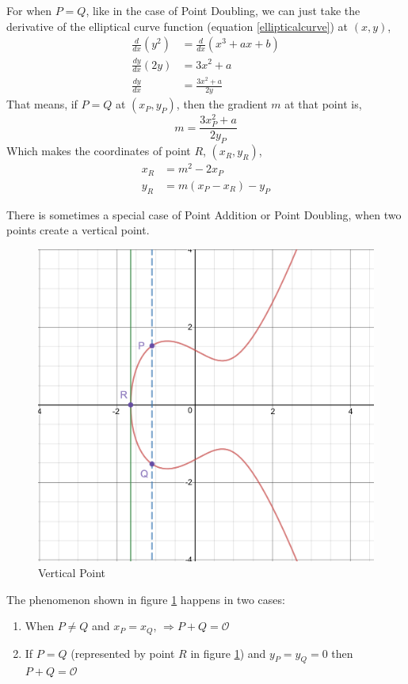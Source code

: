 \documentclass[a4paper,12pt]{article}
\theoremstyle{definition}
\begin{document}
For when $P=Q$, like in the case of Point Doubling, we can just take the derivative of the elliptical curve function (equation \ref{ellipticalcurve}) at $(x,y)$,
\begin{equation}
	\begin{split}
		\frac{d}{dx}(y^2) &= \frac{d}{dx}(x^3 +ax+b) \\
		\frac{dy}{dx}(2y) &= 3x^2+a \\
		\frac{dy}{dx} &= \frac{3x^2+a }{2y}
	\end{split}
\end{equation}
\indent That means, if $P=Q$ at $(x_P,y_P)$, then the gradient $m$ at that point is,
\begin{equation} \label{pointdoublingformula}
	m = \frac{3x_P^2+a }{2y_P} 
\end{equation}
\indent Which makes the coordinates of point $R$, $(x_R,y_R)$,
\begin{equation} \label{pointdoublingcoordinates}
	\begin{split}
		x_R &= m^2 -2x_P \\
		y_R &= m(x_P - x_R)-y_P
	\end{split}
\end{equation}

There is sometimes a special case of Point Addition or Point Doubling, when two points create a vertical point. 

\begin{figure}[!htb]
	 \centering
     \includegraphics[width=.6\linewidth]{verticalpoint2}
     \caption{Vertical Point}
     \label{verticalpointfigure}	
\end{figure}

The phenomenon shown in figure \ref{verticalpointfigure} happens in two cases:
\begin{enumerate}
	\item When $P \neq Q$ and $x_P =x_Q$, $\Rightarrow P+Q= \mathcal{O}$
	\item If $P=Q$ (represented by point $R$ in figure \ref{verticalpointfigure}) and $y_P=y_Q=0$ then $P+Q= \mathcal{O}$
\end{enumerate}
\end{document}

